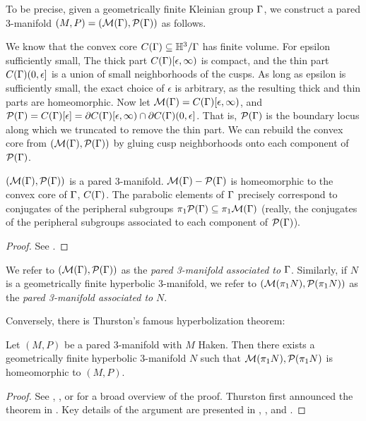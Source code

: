 To be precise, given a geometrically finite Kleinian group $\Gamma$, we construct
a pared 3-manifold $(M,P)=(\mathcal{M}(\Gamma),\mathcal{P}(\Gamma))$ as follows.

We know that the convex core $C(\Gamma) \subseteq \mathbb{H}^3/\Gamma$ has finite volume. For
epsilon sufficiently small, The thick part $C(\Gamma)[\epsilon,\infty)$ is
compact, and the thin part $C(\Gamma)(0,\epsilon]$ is a union of small
neighborhoods of the cusps.  As long as epsilon is sufficiently small, the
exact choice of $\epsilon$ is arbitrary, as the resulting thick and thin parts
are homeomorphic.  Now let $\mathcal{M}(\Gamma) = C(\Gamma)[\epsilon,\infty)$, and $\mathcal{P}(\Gamma)
= C(\Gamma)[\epsilon] = \partial C(\Gamma)[\epsilon,\infty) \cap \partial C(\Gamma)(0,\epsilon]$.
That is, $\mathcal{P}(\Gamma)$ is the boundary locus along which we truncated to remove
the thin part. We can rebuild the convex core from $(\mathcal{M}(\Gamma),\mathcal{P}(\Gamma))$ by
gluing cusp neighborhoods onto each component of $\mathcal{P}(\Gamma)$.

\begin{prop}

$(\mathcal{M}(\Gamma),\mathcal{P}(\Gamma))$ is a pared 3-manifold. $\mathcal{M}(\Gamma)- \mathcal{P}(\Gamma)$ is
homeomorphic to the convex core of $\Gamma$, $C(\Gamma)$. The parabolic elements of
$\Gamma$ precisely correspond to conjugates of the peripheral subgroups
$\pi_1\mathcal{P}(\Gamma) \subseteq \pi_1\mathcal{M}(\Gamma)$ (really, the conjugates of the peripheral
subgroups associated to each component of $\mathcal{P}(\Gamma)$).

\end{prop}

\begin{proof}

See \cite{Mo}. %

\end{proof}

We refer to $(\mathcal{M}(\Gamma),\mathcal{P}(\Gamma))$ as the \emph{pared 3-manifold associated to}
$\Gamma$.  Similarly, if $N$ is a geometrically finite hyperbolic 3-manifold, we
refer to $(\mathcal{M}(\pi_1N),\mathcal{P}(\pi_1N))$ as the \emph{pared 3-manifold associated
to} $N$.

Conversely, there is Thurston's famous hyperbolization theorem:

\begin{thm}

Let $(M,P)$ be a pared 3-manifold with $M$ Haken. Then there exists
a geometrically finite hyperbolic 3-manifold $N$ such that
$\mathcal{M}(\pi_1N),\mathcal{P}(\pi_1N)$ is homeomorphic to $(M,P)$.

\end{thm}

\begin{proof}

See \cite{Mo}, \cite{ThurstonviaScott}, or \cite{Kapovich} for a broad overview
of the proof. Thurston first announced the theorem in \cite{Thurston0}. Key
details of the argument are presented in \cite{ThurstonI}, \cite{ThurstonII},
and \cite{ThurstonIII}.

\end{proof}

